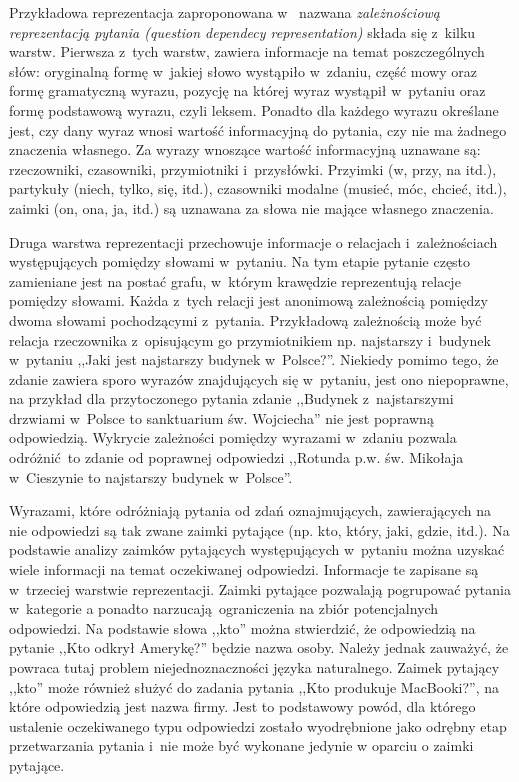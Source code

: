 \documentclass[a4paper, twoside, openright, 12pt]{report}
\begin{document}
            Przykładowa
            reprezentacja zaproponowana w~\cite{PASZKA}
            nazwana \emph{zależnościową reprezentacją pytania (question dependecy representation)} składa się z~kilku
            warstw. Pierwsza z~tych warstw, zawiera informacje na temat poszczególnych słów: oryginalną formę w~jakiej
            słowo wystąpiło w~zdaniu, część mowy oraz formę gramatyczną wyrazu, pozycję na której wyraz wystąpił w~pytaniu
            oraz formę podstawową wyrazu, czyli leksem. Ponadto dla każdego wyrazu określane jest, czy dany wyraz wnosi
            wartość informacyjną do pytania, czy nie ma żadnego znaczenia własnego. Za wyrazy wnoszące wartość informacyjną
            uznawane są: rzeczowniki, czasowniki, przymiotniki i~przysłówki. Przyimki (w, przy, na itd.),
            partykuły (niech, tylko, się, itd.), czasowniki modalne (musieć, móc, chcieć, itd.), zaimki (on, ona, ja, itd.)
            są uznawana za słowa nie mające własnego znaczenia.

            Druga warstwa reprezentacji przechowuje informacje o relacjach i~zależnościach występujących pomiędzy
            słowami w~pytaniu. Na tym etapie pytanie często zamieniane jest na postać grafu, w~którym krawędzie reprezentują
            relacje pomiędzy słowami. Każda z~tych relacji jest anonimową zależnością pomiędzy dwoma słowami pochodzącymi
            z~pytania. Przykładową zależnością może być relacja rzeczownika z~opisującym go przymiotnikiem np. najstarszy
            i~budynek w~pytaniu ,,Jaki jest najstarszy budynek w~Polsce?''. Niekiedy pomimo tego, że zdanie zawiera
            sporo wyrazów znajdujących się w~pytaniu, jest ono niepoprawne, na przykład dla przytoczonego pytania
            zdanie ,,Budynek z~najstarszymi drzwiami w~Polsce to sanktuarium św. Wojciecha'' nie jest poprawną odpowiedzią.
            Wykrycie zależności pomiędzy wyrazami w~zdaniu pozwala odróżnić to zdanie od poprawnej odpowiedzi ,,Rotunda
            p.w. św. Mikołaja w~Cieszynie to najstarszy budynek w~Polsce''.

            Wyrazami, które odróżniają pytania od zdań oznajmujących, zawierających na nie odpowiedzi są tak zwane zaimki
            pytające (np. kto, który, jaki, gdzie, itd.). Na podstawie analizy zaimków pytających występujących w~pytaniu
            można uzyskać wiele informacji na temat oczekiwanej odpowiedzi. Informacje te zapisane są w~trzeciej warstwie
            reprezentacji. Zaimki pytające pozwalają pogrupować pytania w~kategorie a ponadto narzucają ograniczenia
            na zbiór potencjalnych odpowiedzi. Na podstawie słowa ,,kto'' można stwierdzić, że odpowiedzią na pytanie
            ,,Kto odkrył Amerykę?'' będzie nazwa osoby. Należy jednak zauważyć, że powraca tutaj problem niejednoznaczności
            języka naturalnego. Zaimek pytający ,,kto'' może również służyć do zadania pytania ,,Kto produkuje MacBooki?'',
            na które odpowiedzią jest nazwa firmy. Jest to podstawowy powód, dla którego ustalenie oczekiwanego typu
            odpowiedzi zostało wyodrębnione jako odrębny etap przetwarzania pytania i~nie może być wykonane jedynie w
            oparciu o zaimki pytające.
\end{document}
